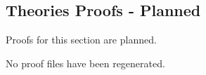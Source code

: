 \subsection*{Theories Proofs - Planned}

Proofs for this section are planned.

No proof files have been regenerated.
